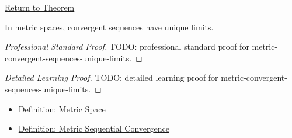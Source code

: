 \newpage
{}
\label{prf:metric-convergent-sequences-unique-limits}

\begin{remark*}[Return]
\hyperref[thm:metric-convergent-sequences-unique-limits]{Return to Theorem}
\end{remark*}

\begin{theorem*}
In metric spaces, convergent sequences have unique limits.
\end{theorem*}

\begin{proof}[Professional Standard Proof]
\LRAProofBodyStart
TODO: professional standard proof for metric-convergent-sequences-unique-limits.
\end{proof}

\begin{proof}[Detailed Learning Proof]
\LRAProofBodyStart
TODO: detailed learning proof for metric-convergent-sequences-unique-limits.
\end{proof}

\begin{remark*}
\end{remark*}

\begin{dependencies}
\begin{itemize}
  \item \hyperref[def:metric-space]{Definition: Metric Space}
  \item \hyperref[def:metric-sequential-convergence]{Definition: Metric Sequential Convergence}
\end{itemize}
\end{dependencies}

\clearpage
